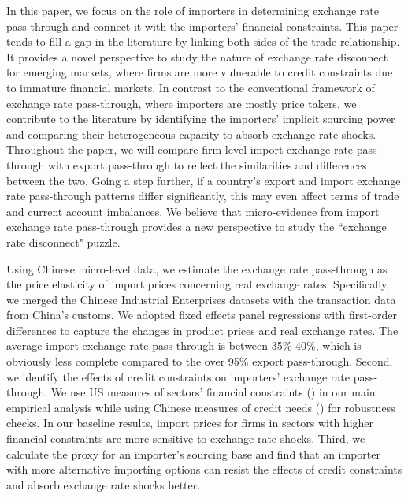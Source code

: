 \documentclass[12pt]{article}
\begin{document}
In this paper, we focus on the role of importers in determining exchange rate pass-through and connect it with the importers' financial constraints. This paper tends to fill a gap in the literature by linking both sides of the trade relationship. It provides a novel perspective to study the nature of exchange rate disconnect for emerging markets, where firms are more vulnerable to credit constraints due to immature financial markets. In contrast to the conventional framework of exchange rate pass-through, where importers are mostly price takers, we contribute to the literature by identifying the importers' implicit sourcing power and comparing their heterogeneous capacity to absorb exchange rate shocks. Throughout the paper, we will compare firm-level import exchange rate pass-through with export pass-through to reflect the similarities and differences between the two. Going a step further, if a country's export and import exchange rate pass-through patterns differ significantly, this may even affect terms of trade and current account imbalances. We believe that micro-evidence from import exchange rate pass-through provides a new perspective to study the ``exchange rate disconnect" puzzle.

Using Chinese micro-level data, we estimate the exchange rate pass-through as the price elasticity of import prices concerning real exchange rates. Specifically, we merged the Chinese Industrial Enterprises datasets with the transaction data from China’s customs. We adopted fixed effects panel regressions with first-order differences to capture the changes in product prices and real exchange rates. The average import exchange rate pass-through is between 35\%-40\%, which is obviously less complete compared to the over 95\% export pass-through. Second, we identify the effects of credit constraints on importers' exchange rate pass-through. We use US measures of sectors’ financial constraints (\cite{manova-wei-zhang2015}) in our main empirical analysis while using Chinese measures of credit needs (\cite{fan-li-yeaple2015}) for robustness checks. In our baseline results, import prices for firms in sectors with higher financial constraints are more sensitive to exchange rate shocks. Third, we calculate the proxy for an importer's sourcing base and find that an importer with more alternative importing options can resist the effects of credit constraints and absorb exchange rate shocks better.
\end{document}
